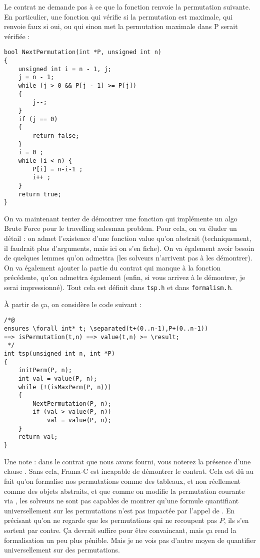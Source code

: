 \documentclass[11pt,answers]{exam}
\begin{document}
\begin{questions}
\begin{parts}
    \begin{solutionorbox}
        Le contrat ne demande pas à ce que la fonction renvoie la permutation suivante.
        En particulier, une fonction qui vérifie si la permutation est maximale, qui renvoie faux si oui, ou qui sinon met la permutation maximale
        dans P serait vérifiée : 

    \begin{lstlisting}
bool NextPermutation(int *P, unsigned int n)
{
    unsigned int i = n - 1, j;
    j = n - 1;
    while (j > 0 && P[j - 1] >= P[j])
    {
        j--;
    }
    if (j == 0)
    {
        return false;
    }
    i = 0 ;
    while (i < n) {
        P[i] = n-i-1 ;
        i++ ;
    }
    return true;
}
    \end{lstlisting}
    \end{solutionorbox}

    \end{parts}


    On va maintenant tenter de démontrer une fonction qui implémente un algo Brute Force pour le travelling salesman problem.
    Pour cela, on va éluder un détail : on admet l’existence d’une fonction value qu’on abstrait (techniquement, il faudrait plus d’arguments, mais ici on s’en fiche). On va également avoir besoin de quelques lemmes qu’on admettra (les solveurs n’arrivent pas à les démontrer).
    On va également ajouter la partie du contrat qui manque à la fonction précédente, qu’on admettra également (enfin, si vous arrivez à le démontrer, je serai impressionné).
    Tout cela est définit dans \texttt{tsp.h} et dans \texttt{formalism.h}.

    À partir de ça, on considère le code suivant :

    \begin{lstlisting}
/*@
ensures \forall int* t; \separated(t+(0..n-1),P+(0..n-1))
==> isPermutation(t,n) ==> value(t,n) >= \result;
 */
int tsp(unsigned int n, int *P)
{
    initPerm(P, n);
    int val = value(P, n);
    while (!(isMaxPerm(P, n)))
    {
        NextPermutation(P, n);
        if (val > value(P, n))
            val = value(P, n);
    }
    return val;
}
    \end{lstlisting}

    Une note : dans le contrat que nous avons fourni, vous noterez la présence d’une clause \code{\\separated}. Sans cela, Frama-C est incapable de démontrer le contrat. Cela est dû au fait qu’on formalise nos permutations comme des tableaux, et non réellement comme des objets abstraits, et que comme on modifie la permutation courante via , les solveurs ne sont pas capables de montrer qu’une formule quantifiant universellement sur les permutations n’est pas impactée par l’appel de . En précisant qu’on ne regarde que les permutations qui ne recoupent pas $P$, ils s’en sortent par contre.
    Ça devrait suffire pour être convaincant, mais ça rend la formalisation un peu plus pénible. Mais je ne vois pas d’autre moyen de quantifier universellement sur des permutations.


\end{questions}
\end{document}
